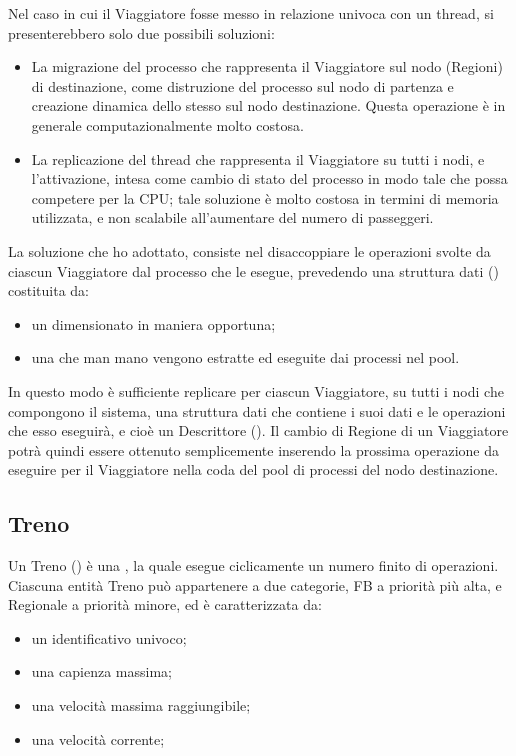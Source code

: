 	Nel caso in cui il Viaggiatore fosse messo in relazione univoca con un thread, si presenterebbero solo due possibili soluzioni:
		\begin{itemize}
			\item La migrazione del processo che rappresenta il Viaggiatore sul nodo (Regioni) di destinazione, come distruzione del processo sul nodo di partenza e creazione dinamica dello stesso sul nodo destinazione. Questa operazione è in generale computazionalmente molto costosa. 
			\item La replicazione del thread che rappresenta il Viaggiatore su tutti i nodi, e l'attivazione, intesa come cambio di stato del processo in modo tale che possa competere per la CPU; tale soluzione è molto costosa in termini di memoria utilizzata, e non scalabile all'aumentare del numero di passeggeri.
		\end{itemize}
		
	La soluzione che ho adottato, consiste nel disaccoppiare le operazioni svolte da ciascun Viaggiatore dal processo che le esegue, prevedendo una struttura dati () costituita da:
		\begin{itemize}
			\item un  dimensionato in maniera opportuna;
			\item una  che man mano vengono estratte ed eseguite dai processi nel pool.
		\end{itemize}
	In questo modo è sufficiente replicare per ciascun Viaggiatore, su tutti i nodi che compongono il sistema, una struttura dati che contiene i suoi dati e le operazioni che esso eseguirà, e cioè un Descrittore (). 
	Il cambio di Regione di un Viaggiatore potrà quindi essere ottenuto semplicemente inserendo la prossima operazione da eseguire per il Viaggiatore nella coda del pool di processi del nodo destinazione.
	
	\subsection{Treno} \label{subsec:train_def}
	Un Treno () è una , la quale esegue ciclicamente un numero finito di operazioni. Ciascuna entità Treno può appartenere a due categorie, FB a priorità più alta, e Regionale a priorità minore, ed è caratterizzata da:
		\begin{itemize}
			\item un identificativo univoco;
			\item una capienza massima;
			\item una velocità massima raggiungibile;
			\item una velocità corrente;
		\end{itemize}
	
